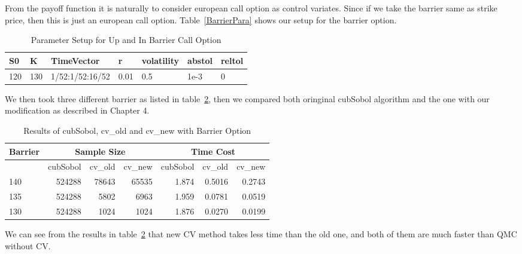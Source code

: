 From the payoff function it is naturally to consider european call option as control variates. Since if we take the barrier same as strike price, then this is just an european call option. Table~\ref{BarrierPara} shows our setup for the barrier option.
\begin{table}[h]
\label{tb:BarrierPara}
    \caption{Parameter Setup for Up and In Barrier Call Option}
    \centering
	\begin{tabular}{lllllll}
        \hline\hline
        S0 & K & TimeVector & r & volatility & abstol & reltol \\[0.5ex]
        \hline
        120  & 130 & 1/52:1/52:16/52 & 0.01 & 0.5 & 1e-3 & 0\\[1ex]
        \hline
	\end{tabular}
\end{table}

We then took three different barrier as listed in table~\ref{tb:BarrierResults}, then we compared both oringinal cubSobol algorithm and the one with our modification as described in Chapter 4. 
\begin{table}[h]
    \centering
    \label{tb:BarrierResults}
	\caption{Results of cubSobol, cv\_old and cv\_new with Barrier Option}
    \begin{tabular}{lrrrrrr}
    \hline\hline
	Barrier &\multicolumn{3}{c}{Sample Size}
		&\multicolumn{3}{c}{Time Cost} \\
    \hline
	&cubSobol&cv\_old&cv\_new
    &cubSobol&cv\_old&cv\_new\\[0.5ex]
    \hline
	140  & 524288&78643& 65535
	     & 1.874& 0.5016&0.2743 \\ 
	135  & 524288& 5802&6963
	     & 1.959& 0.0781&0.0519 \\ 
	130  & 524288& 1024&1024
    & 1.876& 0.0270 & 0.0199 \\[1ex]
    \hline
	\end{tabular}
\end{table}
We can see from the results in table~\ref{tb:BarrierResults} that new CV method takes less time than the old one, and both of them are much faster than QMC without CV.
